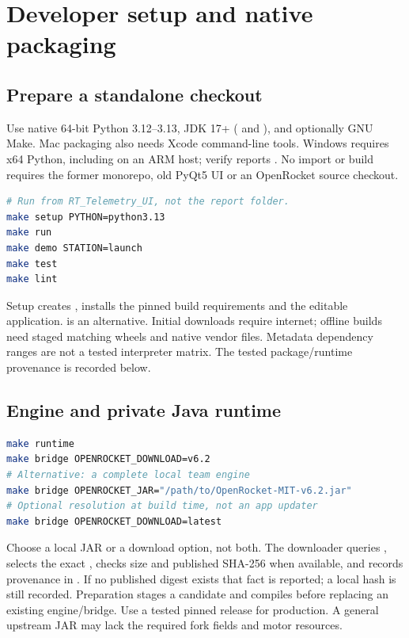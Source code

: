 \section{Developer setup and native packaging}\label{sec:build}
\subsection{Prepare a standalone checkout}
Use native 64-bit Python 3.12--3.13, JDK 17+ ( and ),
and optionally GNU Make. Mac packaging also needs Xcode command-line tools.
Windows requires x64 Python, including on an ARM host; verify
 reports . No import or build
requires the former monorepo, old PyQt5 UI or an OpenRocket source checkout.

\begin{lstlisting}[language=bash]
# Run from RT_Telemetry_UI, not the report folder.
make setup PYTHON=python3.13
make run
make demo STATION=launch
make test
make lint
\end{lstlisting}
Setup creates , installs the pinned build requirements and the
editable application.  is an alternative. Initial
downloads require internet; offline builds need staged matching wheels and
native vendor files. Metadata dependency ranges are not a tested interpreter
matrix. The tested package/runtime provenance is recorded below.

\subsection{Engine and private Java runtime}
\begin{lstlisting}[language=bash]
make runtime
make bridge OPENROCKET_DOWNLOAD=v6.2
# Alternative: a complete local team engine
make bridge OPENROCKET_JAR="/path/to/OpenRocket-MIT-v6.2.jar"
# Optional resolution at build time, not an app updater
make bridge OPENROCKET_DOWNLOAD=latest
\end{lstlisting}
Choose a local JAR or a download option, not both. The downloader queries
, selects the exact
, checks size and published SHA-256 when available,
and records provenance in . If no published digest
exists that fact is reported; a local hash is still recorded. Preparation
stages a candidate and compiles before replacing an existing engine/bridge.
Use a tested pinned release for production. A general upstream JAR may lack
the required fork fields and motor resources.

